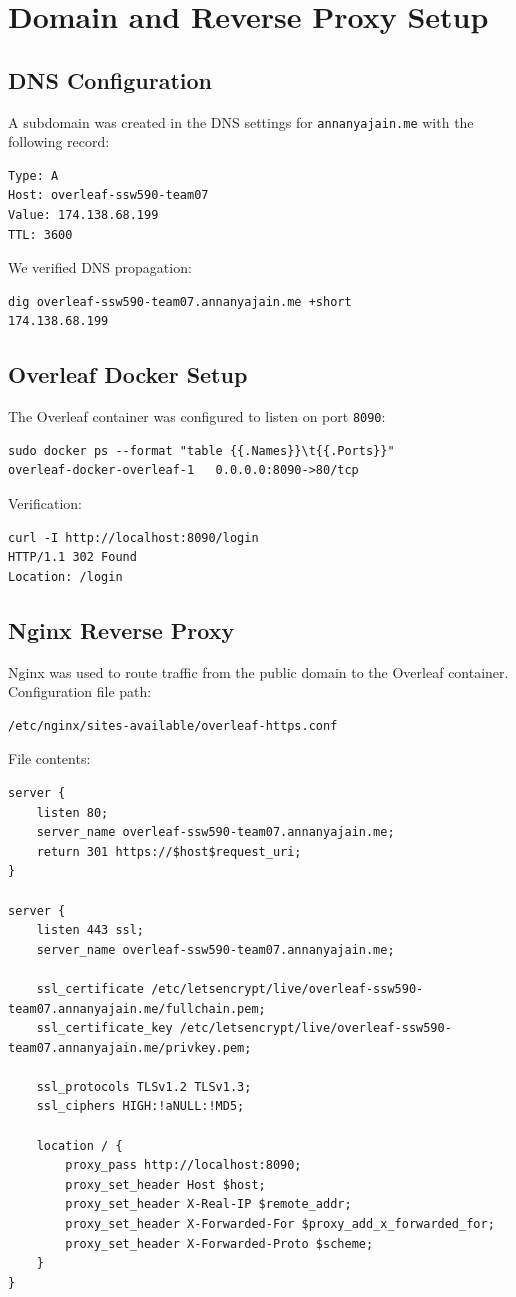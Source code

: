 \section{Domain and Reverse Proxy Setup}
\subsection{DNS Configuration}
A subdomain was created in the DNS settings for \texttt{annanyajain.me} with the following record:
\begin{verbatim}
Type: A
Host: overleaf-ssw590-team07
Value: 174.138.68.199
TTL: 3600
\end{verbatim}

We verified DNS propagation:
\begin{verbatim}
dig overleaf-ssw590-team07.annanyajain.me +short
174.138.68.199
\end{verbatim}

\subsection{Overleaf Docker Setup}
The Overleaf container was configured to listen on port \texttt{8090}:
\begin{verbatim}
sudo docker ps --format "table {{.Names}}\t{{.Ports}}"
overleaf-docker-overleaf-1   0.0.0.0:8090->80/tcp
\end{verbatim}

Verification:
\begin{verbatim}
curl -I http://localhost:8090/login
HTTP/1.1 302 Found
Location: /login
\end{verbatim}

\subsection{Nginx Reverse Proxy}
Nginx was used to route traffic from the public domain to the Overleaf container.  
Configuration file path:
\begin{verbatim}
/etc/nginx/sites-available/overleaf-https.conf
\end{verbatim}

File contents:
\begin{verbatim}
server {
    listen 80;
    server_name overleaf-ssw590-team07.annanyajain.me;
    return 301 https://$host$request_uri;
}

server {
    listen 443 ssl;
    server_name overleaf-ssw590-team07.annanyajain.me;

    ssl_certificate /etc/letsencrypt/live/overleaf-ssw590-team07.annanyajain.me/fullchain.pem;
    ssl_certificate_key /etc/letsencrypt/live/overleaf-ssw590-team07.annanyajain.me/privkey.pem;

    ssl_protocols TLSv1.2 TLSv1.3;
    ssl_ciphers HIGH:!aNULL:!MD5;

    location / {
        proxy_pass http://localhost:8090;
        proxy_set_header Host $host;
        proxy_set_header X-Real-IP $remote_addr;
        proxy_set_header X-Forwarded-For $proxy_add_x_forwarded_for;
        proxy_set_header X-Forwarded-Proto $scheme;
    }
}
\end{verbatim}

